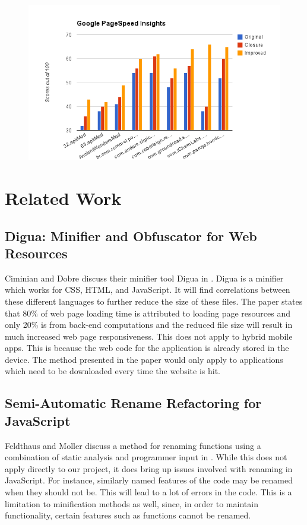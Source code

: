 \documentclass{acm_proc_article-sp}
\begin{document}
\begin{figure}[h!]
    \includegraphics[scale=0.4]{pagespeeds}
\end{figure}

\section{Related Work}
\subsection{Digua: Minifier and Obfuscator for Web Resources \cite{ciminiandigua}}
Ciminian and Dobre discuss their minifier tool Digua in \cite{ciminiandigua}. 
Digua is a minifier which works for CSS, HTML, and JavaScript.  
It will find correlations between these different languages to further reduce the size of these files.
The paper states that 80\% of web page loading time is attributed to loading page resources and only 20\% is from back-end computations and the reduced file size will result in much increased web page responsiveness.
This does not apply to hybrid mobile apps.
This is because the web code for the application is already stored in the device.
The method presented in the paper would only apply to applications which need to be downloaded every time the website is hit. 

\subsection{Semi-Automatic Rename Refactoring for JavaScript \cite{feldthaus2013semi}}
Feldthaus and Moller discuss a method for renaming functions using a combination of static analysis and programmer input in \cite{feldthaus2013semi}.
While this does not apply directly to our project, it does bring up issues involved with renaming in JavaScript.
For instance, similarly named features of the code may be renamed when they should not be.
This will lead to a lot of errors in the code.
This is a limitation to minification methods as well, since, in order to maintain functionality, certain features such as functions cannot be renamed.
\end{document}
